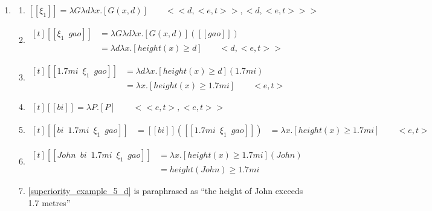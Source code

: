 \documentclass{ctexart}
\begin{document}
\begin{enumerate}
    \item \label{superiority_example_5}
    \begin{enumerate}
        \item \label{superiority_example_5_a}
        $[\![\xi_1]\!] = \lambda G \lambda d \lambda x.[G(x,d)] \qquad <<d,<e,t>>,<d,<e,t>>>$

        \item \label{superiority_example_5_b}
        $\begin{aligned}[t]
            [\![\xi_1 \enspace gao]\!] &= \lambda G \lambda d \lambda x.[G(x,d)]([\![gao]\!]) \\
            &= \lambda d \lambda x.[height(x) \geq d] \qquad <d,<e,t>>
        \end{aligned}$

        \item \label{superiority_example_5_c}
        $\begin{aligned}[t]
            [\![1.7mi \enspace \xi_1 \enspace gao]\!]
            &= \lambda d \lambda x.[height(x) \geq d](1.7mi) \\
            &= \lambda x.[height(x) \geq 1.7mi] \qquad <e,t>
        \end{aligned}$

        \item \label{superiority_example_5_c_1}
        $\begin{aligned}[t]
            [\![bi]\!] = \lambda P.[P] \qquad <<e,t>,<e,t>>
        \end{aligned}$

        \item \label{superiority_example_5_c_2}
        $\begin{aligned}[t]
            [\![bi \enspace 1.7mi \enspace \xi_1 \enspace gao]\!] &= [\![bi]\!]([\![1.7mi \enspace \xi_1 \enspace gao]\!])
            &= \lambda x.[height(x) \geq 1.7mi] \qquad <e,t>
        \end{aligned}$

        \item \label{superiority_example_5_d}
        $\begin{aligned}[t]
            [\![John \enspace bi \enspace 1.7mi \enspace \xi_1 \enspace gao]\!] &= \lambda x.[height(x) \geq 1.7mi](John) \\
            &= height(John) \geq 1.7mi
        \end{aligned}$

        \item \label{superiority_example_5_e}
        \ref{superiority_example_5_d} is paraphrased as ``the height of John exceeds 1.7 metres''

    \end{enumerate}
\end{enumerate}
\end{document}
